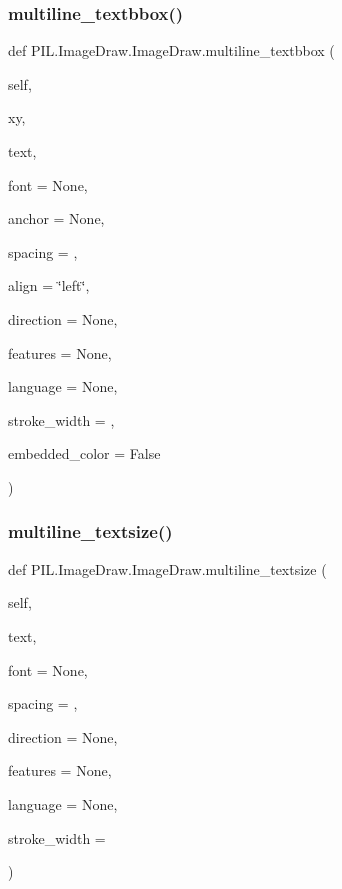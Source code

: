 \subsubsection{\texorpdfstring{multiline\+\_\+textbbox()}{multiline\_textbbox()}}
{\footnotesize\ttfamily def P\+I\+L.\+Image\+Draw.\+Image\+Draw.\+multiline\+\_\+textbbox (\begin{DoxyParamCaption}\item[{}]{self,  }\item[{}]{xy,  }\item[{}]{text,  }\item[{}]{font = {\ttfamily None},  }\item[{}]{anchor = {\ttfamily None},  }\item[{}]{spacing = {},  }\item[{}]{align = {\ttfamily \char`\"{}left\char`\"{}},  }\item[{}]{direction = {\ttfamily None},  }\item[{}]{features = {\ttfamily None},  }\item[{}]{language = {\ttfamily None},  }\item[{}]{stroke\+\_\+width = {},  }\item[{}]{embedded\+\_\+color = {\ttfamily False} }\end{DoxyParamCaption})}

\mbox{\label{classPIL_1_1ImageDraw_1_1ImageDraw_af7cc0cddefee8cb0b2c4d4ce0fa1e0c4}} 
\subsubsection{\texorpdfstring{multiline\+\_\+textsize()}{multiline\_textsize()}}
{\footnotesize\ttfamily def P\+I\+L.\+Image\+Draw.\+Image\+Draw.\+multiline\+\_\+textsize (\begin{DoxyParamCaption}\item[{}]{self,  }\item[{}]{text,  }\item[{}]{font = {\ttfamily None},  }\item[{}]{spacing = {},  }\item[{}]{direction = {\ttfamily None},  }\item[{}]{features = {\ttfamily None},  }\item[{}]{language = {\ttfamily None},  }\item[{}]{stroke\+\_\+width = {} }\end{DoxyParamCaption})}

